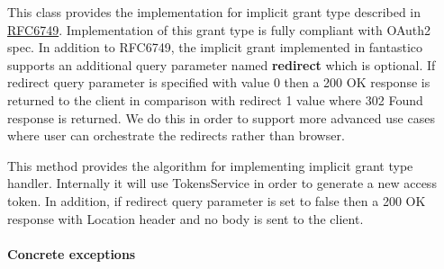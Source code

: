 \documentclass[letterpaper,10pt,english]{sphinxmanual}
\begin{document}

\begin{fulllineitems}
\label{features/oauth2/technical_summary:fantastico.oauth2.implicit_grant_handler.ImplicitGrantHandler}
This class provides the implementation for implicit grant type described in
\href{http://tools.ietf.org/html/rfc6749}{RFC6749}. Implementation of this grant type is fully compliant with 
OAuth2 spec. In addition to RFC6749, the implicit grant implemented in fantastico supports an additional
query parameter named \textbf{redirect} which is optional. If redirect query parameter is specified with value
0 then a 200 OK response is returned to the client in comparison with redirect 1 value where 302 Found response
is returned. We do this in order to support more advanced use cases where user can orchestrate the redirects
rather than browser.

\begin{fulllineitems}
\label{features/oauth2/technical_summary:fantastico.oauth2.implicit_grant_handler.ImplicitGrantHandler.handle_grant}
This method provides the algorithm for implementing implicit grant type handler. Internally it will use TokensService
in order to generate a new access token. In addition, if redirect query parameter is set to false then a 200 OK response
with Location header and no body is sent to the client.

\end{fulllineitems}


\end{fulllineitems}



\paragraph{Concrete exceptions}
\label{features/oauth2/technical_summary:concrete-exceptions}
\end{document}

